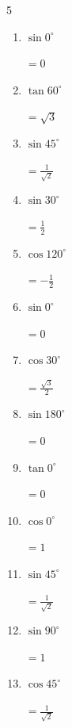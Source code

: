 \begin{multicols}{5}
\begin{enumerate}
        $\displaystyle =\frac{\sqrt{3}}{2}$

  \item $\displaystyle \sin{0^\circ}$

        $\displaystyle =0$

  \item $\displaystyle \tan{60^\circ}$

        $\displaystyle =\sqrt{3}$

  \item $\displaystyle \sin{45^\circ}$

        $\displaystyle =\frac{1}{\sqrt{2}}$

  \item $\displaystyle \sin{30^\circ}$

        $\displaystyle =\frac{1}{2}$

  \item $\displaystyle \cos{120^\circ}$

        $\displaystyle =-\frac{1}{2}$

  \item $\displaystyle \sin{0^\circ}$

        $\displaystyle =0$

  \item $\displaystyle \cos{30^\circ}$

        $\displaystyle =\frac{\sqrt{3}}{2}$

  \item $\displaystyle \sin{180^\circ}$

        $\displaystyle =0$

\columnbreak %

  \item $\displaystyle \tan{0^\circ}$

        $\displaystyle =0$

  \item $\displaystyle \cos{0^\circ}$

        $\displaystyle =1$

  \item $\displaystyle \sin{45^\circ}$

        $\displaystyle =\frac{1}{\sqrt{2}}$

  \item $\displaystyle \sin{90^\circ}$

        $\displaystyle =1$

  \item $\displaystyle \cos{45^\circ}$

        $\displaystyle =\frac{1}{\sqrt{2}}$


\end{enumerate}
\end{multicols}
